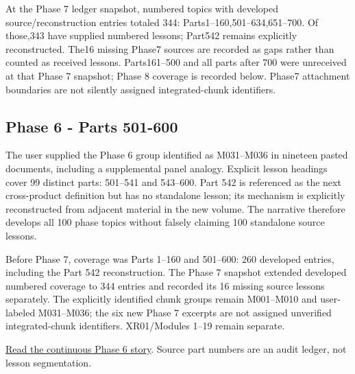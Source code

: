 At the Phase 7 ledger snapshot, numbered topics with developed source/reconstruction entries totaled 344: Parts1--160,501--634,651--700. Of those,343 have supplied numbered lessons; Part542 remains explicitly reconstructed. The16 missing Phase7 sources are recorded as gaps rather than counted as received lessons. Parts161--500 and all parts after 700 were unreceived at that Phase 7 snapshot; Phase 8 coverage is recorded below. Phase7 attachment boundaries are not silently assigned integrated-chunk identifiers.

\subsection{Phase 6 - Parts 501-600}\label{appendix-fd090d982a15-phase-6---parts-501-600}

The user supplied the Phase 6 group identified as M031--M036 in nineteen pasted documents, including a supplemental panel analogy. Explicit lesson headings cover 99 distinct parts: 501--541 and 543--600. Part 542 is referenced as the next cross-product definition but has no standalone lesson; its mechanism is explicitly reconstructed from adjacent material in the new volume. The narrative therefore develops all 100 phase topics without falsely claiming 100 standalone source lessons.

Before Phase 7, coverage was Parts 1--160 and 501--600: 260 developed entries, including the Part 542 reconstruction. The Phase 7 snapshot extended developed numbered coverage to 344 entries and recorded its 16 missing source lessons separately. The explicitly identified chunk groups remain M001--M010 and user-labeled M031--M036; the six new Phase 7 excerpts are not assigned unverified integrated-chunk identifiers. XR01/Modules 1--19 remain separate.

\hyperref[01-foundations-i-ch017-the-panel-gives-us-a-reason-to-learn]{Read the continuous Phase 6 story}. Source part numbers are an audit ledger, not lesson segmentation.

